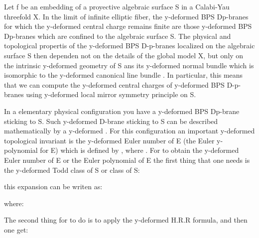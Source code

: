 \documentclass[a4paper,a4paper]{article}
\begin{document}
Let f be an embedding of a proyective algebraic surface S in a Calabi-Yau threefold X. In the limit of infinite elliptic fiber, the y-deformed BPS Dp-branes  for which the y-deformed central charge remains  finite are those y-deformed BPS Dp-branes which are confined to the algebraic surface S. The physical and topological propertis of the y-deformed BPS D-p-branes  localized on the algebraic surface S then dependen not on the details of the
global model X, but only on the intrinsic y-deformed  geometry of S ans its y-deformed normal bundle \coordHE{} which is isomorphic to the y-deformed canonical line bundle \coordHE{}. In particular, this means that we can compute the y-deformed central charges of y-deformed BPS D-p-branes using y-deformed local mirror symmetry principle on S.

In a elementary physical configuration you have a y-deformed BPS Dp-brane sticking to S.  Such y-deformed  D-brane sticking to S can be described mathematically by a y-deformed \coordHE{}. For this configuration an important y-deformed topological invariant is the y-deformed Euler number of E (the Euler y-polynomial for E) which is defined by  \coordHE{}, where \coordHE{}.
For to obtain the y-deformed Euler number of E or the Euler  polynomial of E
the first thing that one needs is the y-deformed Todd class of S or \coordHE{} class of S:

\begin{center}
{  \coordHE{} }
\end{center}

this expansion can be writen as:

\begin{center}
{  \coordHE{} }
\end{center}
where:

\begin{center}
{  \coordHE{} }

\end{center}
 The second thing for to do is to apply the y-deformed H.R.R formula, and then one get:
\end{document}
